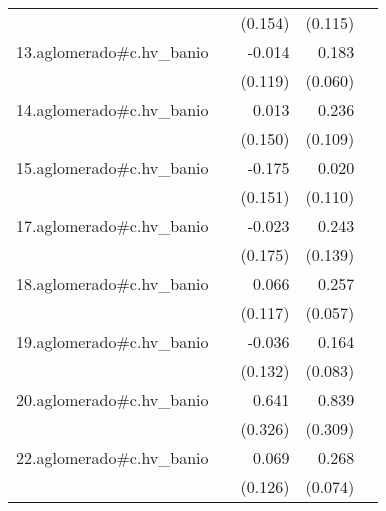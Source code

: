 {\begin{longtable}{l*{4}{D{.}{.}{-1}}}
            &                     &     (0.154)         &     (0.115)         &                     \\
\addlinespace
13.aglomerado#c.hv\_banio&                     &      -0.014         &       0.183\sym{**} &                     \\
            &                     &     (0.119)         &     (0.060)         &                     \\
\addlinespace
14.aglomerado#c.hv\_banio&                     &       0.013         &       0.236\sym{*}  &                     \\
            &                     &     (0.150)         &     (0.109)         &                     \\
\addlinespace
15.aglomerado#c.hv\_banio&                     &      -0.175         &       0.020         &                     \\
            &                     &     (0.151)         &     (0.110)         &                     \\
\addlinespace
17.aglomerado#c.hv\_banio&                     &      -0.023         &       0.243         &                     \\
            &                     &     (0.175)         &     (0.139)         &                     \\
\addlinespace
18.aglomerado#c.hv\_banio&                     &       0.066         &       0.257\sym{***}&                     \\
            &                     &     (0.117)         &     (0.057)         &                     \\
\addlinespace
19.aglomerado#c.hv\_banio&                     &      -0.036         &       0.164\sym{*}  &                     \\
            &                     &     (0.132)         &     (0.083)         &                     \\
\addlinespace
20.aglomerado#c.hv\_banio&                     &       0.641\sym{*}  &       0.839\sym{**} &                     \\
            &                     &     (0.326)         &     (0.309)         &                     \\
\addlinespace
22.aglomerado#c.hv\_banio&                     &       0.069         &       0.268\sym{***}&                     \\
            &                     &     (0.126)         &     (0.074)         &                     \\

\end{longtable}}
